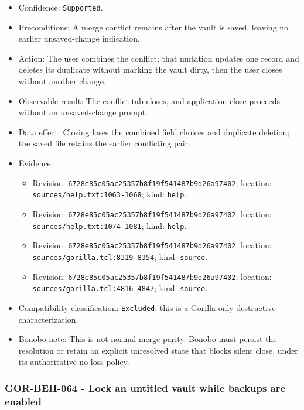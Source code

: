 \documentclass[
  letterpaper,
]{article}
\newcommand{\passthrough}[1]{#1}
\providecommand{\tightlist}{%
  \setlength{\itemsep}{0pt}\setlength{\parskip}{0pt}}
\begin{document}
\begin{itemize}
\tightlist
\item
  Confidence: \passthrough{\lstinline!Supported!}.
\item
  Preconditions: A merge conflict remains after the vault is saved, leaving no earlier unsaved-change indication.
\item
  Action: The user combines the conflict; that mutation updates one record and deletes its duplicate without marking the
  vault dirty, then the user closes without another change.
\item
  Observable result: The conflict tab closes, and application close proceeds without an unsaved-change prompt.
\item
  Data effect: Closing loses the combined field choices and duplicate deletion; the saved file retains the earlier
  conflicting pair.
\item
  Evidence:

  \begin{itemize}
  \tightlist
  \item
    Revision: \nolinkurl{6728e85c05ac25357b8f19f541487b9d26a97402}; location: \nolinkurl{sources/help.txt:1063-1068};
    kind: \passthrough{\lstinline!help!}.
  \item
    Revision: \nolinkurl{6728e85c05ac25357b8f19f541487b9d26a97402}; location: \nolinkurl{sources/help.txt:1074-1081};
    kind: \passthrough{\lstinline!help!}.
  \item
    Revision: \nolinkurl{6728e85c05ac25357b8f19f541487b9d26a97402}; location: \nolinkurl{sources/gorilla.tcl:8319-8354};
    kind: \passthrough{\lstinline!source!}.
  \item
    Revision: \nolinkurl{6728e85c05ac25357b8f19f541487b9d26a97402}; location: \nolinkurl{sources/gorilla.tcl:4816-4847};
    kind: \passthrough{\lstinline!source!}.
  \end{itemize}
\item
  Compatibility classification: \passthrough{\lstinline!Excluded!}; this is a Gorilla-only destructive characterization.
\item
  Bonobo note: This is not normal merge parity. Bonobo must persist the resolution or retain an explicit unresolved
  state that blocks silent close, under its authoritative no-loss policy.
\end{itemize}

\subsubsection{GOR-BEH-064 - Lock an untitled vault while backups are
enabled}\label{gor-beh-064---lock-an-untitled-vault-while-backups-are-enabled}
\end{document}
